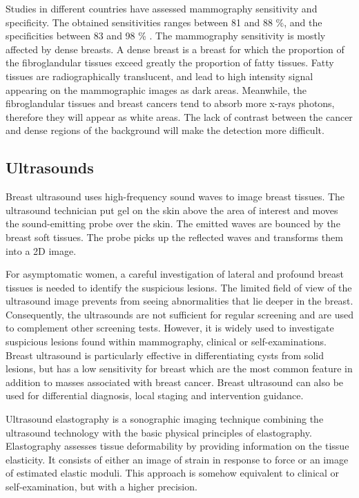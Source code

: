  
Studies in different countries have assessed mammography sensitivity and specificity. The obtained sensitivities ranges between 81 and 88 \%, and the specificities between 83 and 98 \% \citep{kemp_comparing_2015,hofvind_sensitivity_2012}. The mammography sensitivity is mostly affected by dense breasts. A dense breast is a breast for which the  proportion of the fibroglandular tissues exceed greatly the proportion of fatty tissues. Fatty tissues are radiographically translucent, and lead to high intensity signal appearing on the mammographic images as dark areas. Meanwhile, the fibroglandular tissues and breast cancers tend to absorb more x-rays photons, therefore they will appear as white areas. The lack of contrast between the cancer and dense regions of the background will make the detection more difficult.      
 

\subsection{Ultrasounds}\label{subsection:ultrasound}

Breast ultrasound uses high-frequency sound waves to image breast tissues. The ultrasound technician put gel on the skin above the area of interest and moves the sound-emitting probe over the skin. The emitted waves are bounced by the breast soft tissues. The probe picks up the reflected waves and transforms them into a 2D image. 

For asymptomatic women, a careful investigation of lateral and profound breast tissues is needed to identify the suspicious lesions. The limited field of view of the ultrasound image prevents from seeing abnormalities that lie deeper in the breast. Consequently, the ultrasounds are not sufficient for regular screening and are used to complement other screening tests. However, it is widely used to investigate suspicious lesions found within mammography, clinical or self-examinations. Breast ultrasound is particularly effective in differentiating  cysts from solid lesions, but has a low sensitivity for breast which are the most common feature in addition to masses associated with breast cancer.
Breast ultrasound can also be used for differential diagnosis, local staging and intervention guidance.

Ultrasound elastography is a sonographic imaging technique combining the ultrasound technology with the basic physical principles of elastography. Elastography assesses tissue deformability by providing information on the tissue elasticity. It consists of either an image of strain in response to force or an image of estimated elastic moduli. This approach is somehow equivalent to clinical or self-examination, but with a higher precision.

